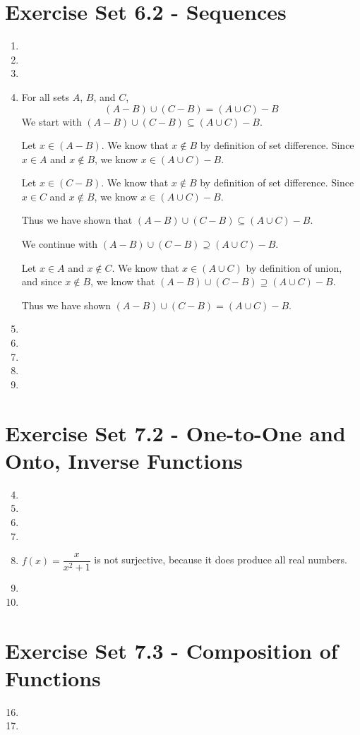 \documentclass[12pt]{article}
\begin{document}
\section*{Exercise Set 6.2 - Sequences}
\begin{enumerate}
\item %
\setcounter{enumi}{6}
\item %
\item %
\item %
For all sets $A$, $B$, and $C$, 
$$(A - B) \cup (C - B) = (A \cup C) - B$$
We start with $(A - B) \cup (C - B) \subseteq (A \cup C) - B$.

Let $x \in (A - B)$. We know that $x \not\in B$ by definition of set difference. Since $x \in A$ and $x
\not\in B$, we know $x \in (A \cup C) - B$.

Let $x \in (C - B)$. We know that $x \not\in B$ by definition of set difference. Since $x \in C$ and $x
\not\in B$, we know $x \in (A \cup C) - B$.

Thus we have shown that $(A - B) \cup (C - B) \subseteq (A \cup C) - B$.

We continue with $(A - B) \cup (C - B) \supseteq (A \cup C) - B$.

Let $x \in A$ and $x \not\in C$. We know that $x \in (A \cup C)$ by definition of union, and since $x \not\in
B$, we know that $(A - B) \cup (C - B) \supseteq (A \cup C) - B$.

Thus we have shown $(A - B) \cup (C - B) = (A \cup C) - B$.

\setcounter{enumi}{11}
\item %
\item %
\setcounter{enumi}{15}
\item %
\setcounter{enumi}{24}
\item %
\setcounter{enumi}{33}
\item %

\end{enumerate}
\section*{Exercise Set 7.2 - One-to-One and Onto, Inverse Functions}
\begin{enumerate}
\setcounter{enumi}{3}
\item %
\item %
\item %
\setcounter{enumi}{14}
\item %
\item %
$f(x) = \dfrac{x}{x^{2}+1}$ is not surjective, because it does produce all real numbers.
\setcounter{enumi}{35}
\item %
\item %
\end{enumerate}

\section*{Exercise Set 7.3 - Composition of Functions}
\begin{enumerate}
\setcounter{enumi}{15}
\item %
\item %
\end{enumerate}
\end{document}
